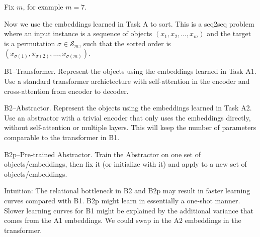 \documentclass[12pt,pdftex,noinfoline]{imsart}
\def\S{{\mathcal{S}}}
\begin{document}
Fix $m$, for example $m=7$. 

Now we use the embeddings learned in Task A to sort. This is a seq2seq problem where an input instance is a sequence of objects $(x_1,x_2,\ldots, x_m)$ and the target is a permutation $\sigma \in \S_m$, such that the sorted order 
is $(x_{\sigma(1)}, x_{\sigma(2)}, \ldots, x_{\sigma(m)})$.


B1--Transformer. Represent the objects using the embeddings learned in Task A1. Use a standard transformer 
archictecture with self-attention in the encoder and cross-attention from encoder to decoder. 

B2--Abstractor. Represent the objects using the embeddings learned in Task A2. Use an abstractor 
with a trivial encoder that only uses the embeddings directly, without self-attention or multiple layers. 
This will keep the number of parameters comparable to the transformer in B1.

B2p--Pre-trained Abstractor. Train the Abstractor on one set of objects/embeddings, then fix it (or initialize with it) and apply to a new set of objects/embeddings.


Intuition: The relational bottleneck in B2 and B2p may result in faster learning curves compared with B1.
B2p might learn in essentially a one-shot manner. Slower learning curves for B1 might be explained by 
the additional variance that comes from the A1 embeddings. We could swap in the A2 embeddings in the transformer.
\end{document}

